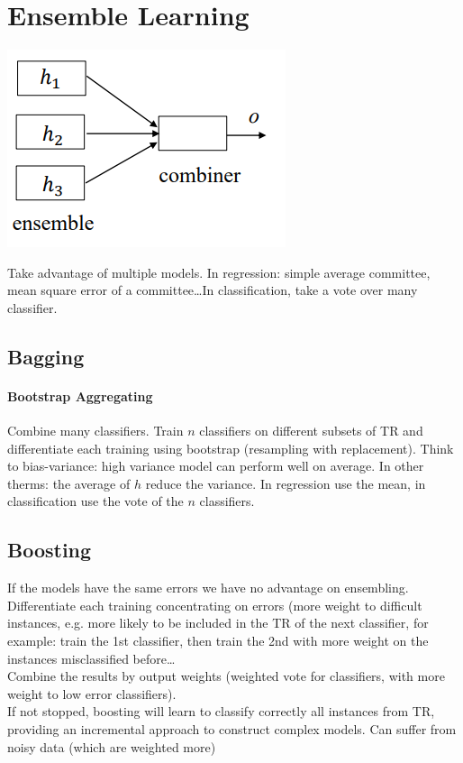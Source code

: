 \documentclass[10pt]{report}
\begin{document}
\section{Ensemble Learning}
\begin{center}
	\includegraphics[scale=0.5]{25.png}
\end{center}
Take advantage of multiple models. In regression: simple average committee, mean square error of a committee\ldots In classification, take a vote over many classifier.
\subsection{Bagging} \paragraph{Bootstrap Aggregating} Combine many classifiers. Train $n$ classifiers on different subsets of TR and differentiate each training using bootstrap (resampling with replacement). Think to bias-variance: high variance model can perform well on average. In other therms: the average of $h$ reduce the variance. In regression use the mean, in classification use the vote of the $n$ classifiers.
\subsection{Boosting} If the models have the same errors we have no advantage on ensembling.\\
Differentiate each training concentrating on errors (more weight to difficult instances, e.g. more likely to be included in the TR of the next classifier, for example: train the 1st classifier, then train the 2nd with more weight on the instances misclassified before\ldots\\
Combine the results by output weights (weighted vote for classifiers, with more weight to low error classifiers).\\
If not stopped, boosting will learn to classify correctly all instances from TR, providing an incremental approach to construct complex models. Can suffer from noisy data (which are weighted more)
\end{document}
